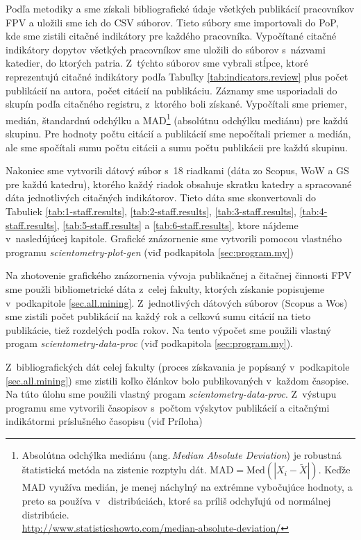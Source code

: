 Podľa metodiky \citet{Kazakis2014a} a \citet{Kazakis2014b,Kazakis2015} sme
získali bibliografické údaje všetkých publikácií pracovníkov FPV a uložili sme
ich do CSV súborov. Tieto súbory sme importovali do PoP, kde sme zistili citačné
indikátory pre každého pracovníka. Vypočítané citačné indikátory dopytov
všetkých pracovníkov sme uložili do súborov s~názvami katedier, do ktorých
patria. Z~týchto súborov sme vybrali stĺpce, ktoré reprezentujú citačné
indikátory podľa Tabuľky \ref{tab:indicators.review} plus počet publikácií na
autora, počet citácií na publikáciu.  Záznamy sme usporiadali do skupín podľa
citačného registru, z~ktorého boli získané.  Vypočítali sme priemer, medián,
štandardnú odchýlku a MAD\footnote{Absolútna odchýlka mediánu
  (ang.\,\emph{Median Absolute Deviation}) je robustná štatistická metóda na
  zistenie rozptylu dát.  $\mathrm{MAD} = \mathrm{Med}(|X_i - \tilde{X}|)$.
  Keďže MAD využíva medián, je menej náchylný na extrémne vybočujúce hodnoty, a
  preto sa používa v~ distribúciách, ktoré sa príliš odchyľujú od normálnej
  distribúcie.\\\url{http://www.statisticshowto.com/median-absolute-deviation/}}
(absolútnu odchýlku mediánu) pre každú skupinu. Pre hodnoty počtu citácií a
publikácií sme nepočítali priemer a medián, ale sme spočítali sumu počtu citácii
a sumu počtu publikácii pre každú skupinu.

Nakoniec sme vytvorili dátový súbor s~18 riadkami (dáta zo Scopus, WoW a GS pre
každú katedru), ktorého každý riadok obsahuje skratku katedry a spracované dáta
jednotlivých citačných indikátorov.  Tieto dáta sme skonvertovali do Tabuliek
\ref{tab:1-staff.results}, \ref{tab:2-staff.results}, \ref{tab:3-staff.results},
\ref{tab:4-staff.results}, \ref{tab:5-staff.results} a
\ref{tab:6-staff.results}, ktore nájdeme v~nasledújúcej kapitole. Grafické
znázornenie sme vytvorili pomocou vlastného programu
\emph{scientometry-plot-gen} (viď podkapitola \ref{sec:program.my})

Na zhotovenie grafického znázornenia vývoja publikačnej a čitačnej činnosti FPV
sme použli bibliometrické dáta z~celej fakulty, ktorých získanie popisujeme
v~podkapitole \ref{sec.all.mining}. Z~jednotlivých dátových súborov (Scopus a
Wos) sme zistili počet publikácií na každý rok a celkovú sumu citácií na tieto
publikácie, tiež rozdelých podľa rokov. Na tento výpočet sme použili vlastný
progam \emph{scientometry-data-proc} (viď podkapitola \ref{sec:program.my}).

Z~bibliografických dát celej fakulty (proces získavania je popísaný
v~podkapitole \ref{sec.all.mining}) sme zistili koľko článkov bolo publikovaných
v~každom časopise.  Na túto úlohu sme použili vlastný progam
\emph{scientometry-data-proc}. Z~výstupu programu sme vytvorili časopisov
s~počtom výskytov publikácií a citačnými indikátormi príslušného časopisu (viď
Príloha)


